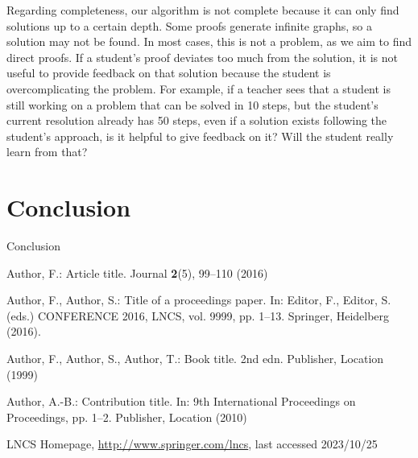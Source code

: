 \documentclass[runningheads]{llncs}
\begin{document}
Regarding completeness, our algorithm is not complete because it can only find solutions up to a certain depth. Some proofs generate infinite graphs, so a solution may not be found. In most cases, this is not a problem, as we aim to find direct proofs. If a student’s proof deviates too much from the solution, it is not useful to provide feedback on that solution because the student is overcomplicating the problem. For example, if a teacher sees that a student is still working on a problem that can be solved in 10 steps, but the student’s current resolution already has 50 steps, even if a solution exists following the student’s approach, is it helpful to give feedback on it? Will the student really learn from that? 


\section{Conclusion}
Conclusion

\begin{thebibliography}{8}
Author, F.: Article title. Journal \textbf{2}(5), 99--110 (2016)

Author, F., Author, S.: Title of a proceedings paper. In: Editor,
F., Editor, S. (eds.) CONFERENCE 2016, LNCS, vol. 9999, pp. 1--13.
Springer, Heidelberg (2016). 

Author, F., Author, S., Author, T.: Book title. 2nd edn. Publisher,
Location (1999)

Author, A.-B.: Contribution title. In: 9th International Proceedings
on Proceedings, pp. 1--2. Publisher, Location (2010)

LNCS Homepage, \url{http://www.springer.com/lncs}, last accessed 2023/10/25
\end{thebibliography}
\end{document}
